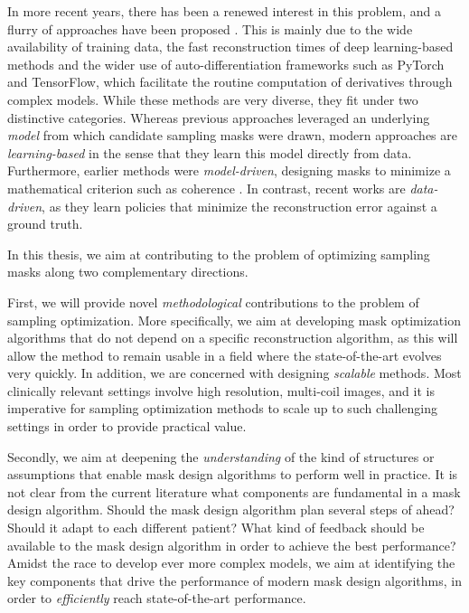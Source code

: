In more recent years, there has been a renewed interest in this problem, and a flurry of approaches have been proposed \citep{gozcu2018learning,jin2019self,sherry2019learning,bahadir2019learning,Huijben2020Deep,pineda2020active,bakker2020experimental,yin2021end}. This is mainly due to the wide availability of training data, the fast reconstruction times of deep learning-based methods and the wider use of auto-differentiation frameworks such as PyTorch and TensorFlow, which facilitate the routine computation of derivatives through complex models. While these methods are very diverse, they fit under two distinctive categories. Whereas previous approaches leveraged an underlying \textit{model} from which candidate sampling masks were drawn, modern approaches are \textit{learning-based} in the sense that they learn this model directly from data. Furthermore, earlier methods were \textit{model-driven}, designing masks to minimize a mathematical criterion such as coherence \citep{lustig2008compressed}. In contrast, recent works are \textit{data-driven}, as they learn policies that minimize the reconstruction error against a ground truth.

In this thesis, we aim at contributing to the problem of optimizing sampling masks along two complementary directions. 

First, we will provide novel \textit{methodological} contributions to the problem of sampling optimization. More specifically, we aim at developing mask optimization algorithms that do not depend on a specific reconstruction algorithm, as this will allow the method to remain usable in a field where the state-of-the-art evolves very quickly. In addition, we are concerned with designing \textit{scalable} methods. Most clinically relevant settings involve high resolution, multi-coil images, and it is imperative for sampling optimization methods to scale up to such challenging settings in order to provide practical value.

Secondly, we aim at deepening the \textit{understanding} of the kind of structures or assumptions that enable mask design algorithms to perform well in practice. It is not clear from the current literature what components are fundamental in a mask design algorithm.
Should the mask design algorithm plan several steps of ahead? Should it adapt to each different patient?
What kind of feedback should be available to the mask design algorithm in order to achieve the best performance? Amidst the race to develop ever more complex models, we aim at identifying the key components that drive the performance of modern mask design algorithms, in order to \textit{efficiently} reach state-of-the-art performance.


